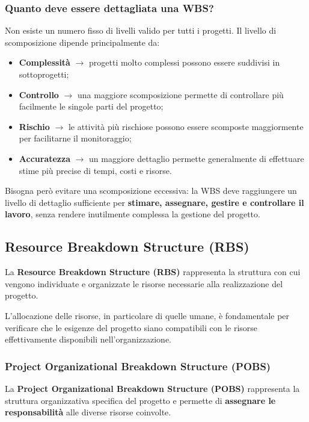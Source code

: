 \subsubsection*{Quanto deve essere dettagliata una WBS?}
Non esiste un numero fisso di livelli valido per tutti i progetti. Il livello di scomposizione dipende principalmente da:

\begin{itemize}
    \item \textbf{Complessità} $\rightarrow$ progetti molto complessi possono essere suddivisi in sottoprogetti;
    \item \textbf{Controllo} $\rightarrow$ una maggiore scomposizione permette di controllare più facilmente le singole parti del progetto;
    \item \textbf{Rischio} $\rightarrow$ le attività più rischiose possono essere scomposte maggiormente per facilitarne il monitoraggio;
    \item \textbf{Accuratezza} $\rightarrow$ un maggiore dettaglio permette generalmente di effettuare stime più precise di tempi, costi e risorse.
\end{itemize}

\noindent Bisogna però evitare una scomposizione eccessiva: la WBS deve raggiungere un livello di dettaglio sufficiente per \textbf{stimare, assegnare, gestire e controllare il lavoro}, 
senza rendere inutilmente complessa la gestione del progetto.

\subsection{Resource Breakdown Structure (RBS)}

\noindent La \textbf{Resource Breakdown Structure (RBS)} rappresenta la struttura con cui vengono individuate e organizzate le risorse necessarie 
alla realizzazione del progetto.

\medskip

\noindent L'allocazione delle risorse, in particolare di quelle umane, è fondamentale 
per verificare che le esigenze del progetto siano compatibili con le risorse effettivamente disponibili nell'organizzazione.

\subsubsection*{Project Organizational Breakdown Structure (POBS)}

\noindent La \textbf{Project Organizational Breakdown Structure (POBS)} rappresenta la struttura 
organizzativa specifica del progetto e permette di \textbf{assegnare le responsabilità} alle diverse risorse coinvolte.

